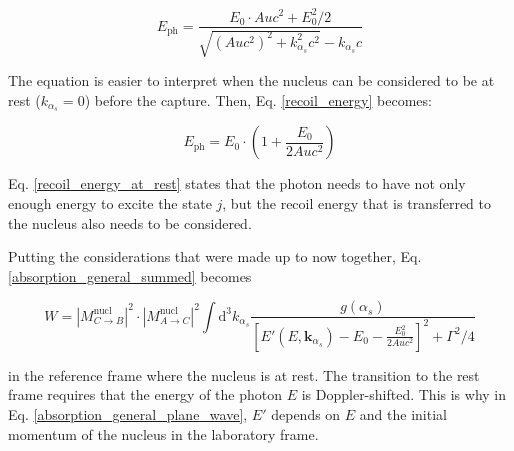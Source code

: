 \documentclass{article}
\begin{document}
\begin{equation}
	\label{recoil_energy}
	E_\mathrm{ph} = \frac{E_0 \cdot Auc^2 + E_0^2/2}{\sqrt{\left( Auc^2\right)^2 + k_{\alpha_s}^2 c^2} - k_{\alpha_s}c}
\end{equation}

The equation is easier to interpret when the nucleus can be considered to be at rest ($k_{\alpha_s} = 0$) before the capture. 
Then, Eq. \ref{recoil_energy} becomes:

\begin{equation}
	\label{recoil_energy_at_rest}
	E_\mathrm{ph} = E_0 \cdot \left( 1 + \frac{E_0}{2 Auc^2} \right)
\end{equation}

Eq. \ref{recoil_energy_at_rest} states that the photon needs to have not only enough energy to excite the state $j$, but the recoil energy that is transferred to the nucleus also needs to be considered.

Putting the considerations that were made up to now together, Eq. \ref{absorption_general_summed} becomes

\begin{equation}
\label{absorption_general_plane_wave}
	W = \left| M^{\mathrm{nucl}}_{C \to B} \right|^2 \cdot \left| M^{\mathrm{nucl}}_{A \to C} \right|^2 \int \mathrm{d}^3 k_{\alpha_s}  \frac{g(\alpha_s)}{ \left[ E' (E, \mathbf{k}_{\alpha_s})- E_0 - \frac{E_0^2}{2 Auc^2} \right]^2 + \Gamma^2 / 4}
\end{equation}

in the reference frame where the nucleus is at rest. 
The transition to the rest frame requires that the energy of the photon $E$ is Doppler-shifted.
This is why in Eq. \ref{absorption_general_plane_wave}, $E'$ depends on $E$ and the initial momentum of the nucleus in the laboratory frame.

%
\end{document}
